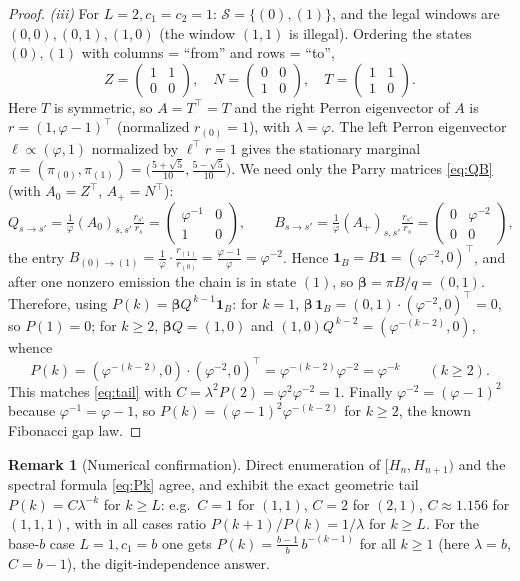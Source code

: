 \documentclass[12pt]{article}
\theoremstyle{definition}
\newtheorem{remark}{Remark}
\newcommand{\one}{\mathbf{1}}
\begin{document}
\begin{proof}
\emph{(iii)} For $L=2,c_1=c_2=1$: $\mathcal S=\{(0),(1)\}$, and the legal windows
are $(0,0),(0,1),(1,0)$ (the window $(1,1)$ is illegal). Ordering the states
$(0),(1)$ with columns = ``from'' and rows = ``to'',
\[
Z=\begin{pmatrix}1&1\\0&0\end{pmatrix},\quad
N=\begin{pmatrix}0&0\\1&0\end{pmatrix},\quad
T=\begin{pmatrix}1&1\\1&0\end{pmatrix}.
\]
Here $T$ is symmetric, so $A=T^\top=T$ and the right Perron eigenvector of $A$ is
$r=(1,\varphi-1)^\top$ (normalized $r_{(0)}=1$), with $\lambda=\varphi$. The left
Perron eigenvector $\ell\propto(\varphi,1)$ normalized by $\ell^\top r=1$ gives the
stationary marginal $\pi=(\pi_{(0)},\pi_{(1)})=\big(\tfrac{5+\sqrt5}{10},\tfrac{5-\sqrt5}{10}\big)$.
We need only the Parry matrices \eqref{eq:QB} (with $A_0=Z^\top$, $A_+=N^\top$):
\[
Q_{s\to s'}=\tfrac1\varphi (A_0)_{s,s'}\tfrac{r_{s'}}{r_s}
=\begin{pmatrix}\varphi^{-1}&0\\1&0\end{pmatrix},\qquad
B_{s\to s'}=\tfrac1\varphi (A_+)_{s,s'}\tfrac{r_{s'}}{r_s}
=\begin{pmatrix}0&\varphi^{-2}\\0&0\end{pmatrix},
\]
the entry $B_{(0)\to(1)}=\frac1\varphi\cdot\frac{r_{(1)}}{r_{(0)}}=\frac{\varphi-1}{\varphi}=\varphi^{-2}$.
Hence $\mathbf 1_B=B\one=(\varphi^{-2},0)^\top$, and after one nonzero emission the
chain is in state $(1)$, so $\boldsymbol\beta=\pi B/q=(0,1)$. Therefore, using
$P(k)=\boldsymbol\beta Q^{\,k-1}\mathbf 1_B$: for $k=1$,
$\boldsymbol\beta\,\mathbf 1_B=(0,1)\cdot(\varphi^{-2},0)^\top=0$, so $P(1)=0$;
for $k\ge2$, $\boldsymbol\beta Q=(1,0)$ and $(1,0)Q^{\,k-2}=(\varphi^{-(k-2)},0)$,
whence
\[
P(k)=(\varphi^{-(k-2)},0)\cdot(\varphi^{-2},0)^\top=\varphi^{-(k-2)}\varphi^{-2}
=\varphi^{-k}\qquad(k\ge2).
\]
This matches \eqref{eq:tail} with $C=\lambda^{2}P(2)=\varphi^{2}\varphi^{-2}=1$.
Finally $\varphi^{-2}=(\varphi-1)^2$ because $\varphi^{-1}=\varphi-1$, so
$P(k)=(\varphi-1)^2\varphi^{-(k-2)}$ for $k\ge2$, the known Fibonacci gap law.
\end{proof}

\begin{remark}[Numerical confirmation]
Direct enumeration of $[H_n,H_{n+1})$ and the spectral formula \eqref{eq:Pk}
agree, and exhibit the exact geometric tail $P(k)=C\lambda^{-k}$ for $k\ge L$:
e.g.\ $C=1$ for $(1,1)$, $C=2$ for $(2,1)$, $C\approx1.156$ for $(1,1,1)$, with in
all cases ratio $P(k+1)/P(k)=1/\lambda$ for $k\ge L$. For the base-$b$ case
$L=1,c_1=b$ one gets $P(k)=\tfrac{b-1}{b}\,b^{-(k-1)}$ for all $k\ge1$ (here
$\lambda=b$, $C=b-1$), the digit-independence answer.
\end{remark}
\end{document}

